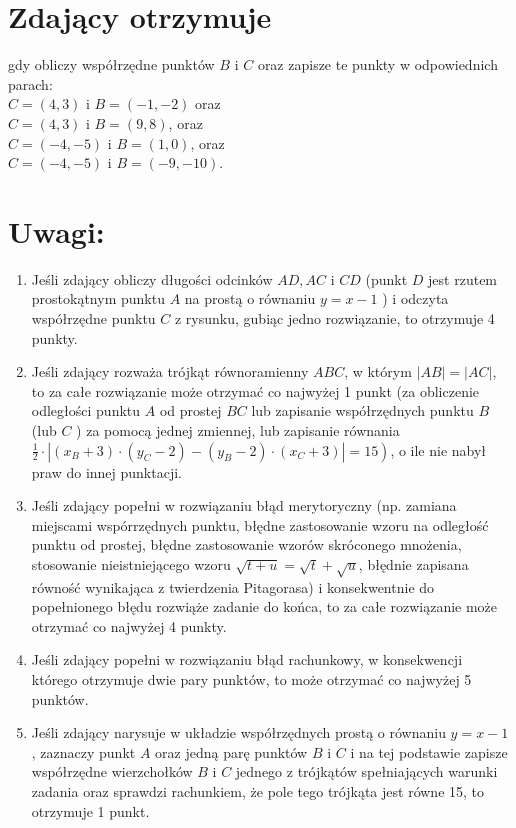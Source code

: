 \documentclass[10pt]{article}
\begin{document}
\section*{Zdający otrzymuje}
gdy obliczy współrzędne punktów $B$ i $C$ oraz zapisze te punkty w odpowiednich parach:\\
$C=(4,3)$ i $B=(-1,-2)$ oraz\\
$C=(4,3)$ i $B=(9,8)$, oraz\\
$C=(-4,-5)$ i $B=(1,0)$, oraz\\
$C=(-4,-5)$ i $B=(-9,-10)$.

\section*{Uwagi:}
\begin{enumerate}
  \item Jeśli zdający obliczy długości odcinków $A D, A C$ i $C D$ (punkt $D$ jest rzutem prostokątnym punktu $A$ na prostą o równaniu $y=x-1$ ) i odczyta współrzędne punktu $C$ z rysunku, gubiąc jedno rozwiązanie, to otrzymuje 4 punkty.
  \item Jeśli zdający rozważa trójkąt równoramienny $A B C$, w którym $|A B|=|A C|$, to za całe rozwiązanie może otrzymać co najwyżej 1 punkt (za obliczenie odległości punktu $A$ od prostej $B C$ lub zapisanie współrzędnych punktu $B$ (lub $C$ ) za pomocą jednej zmiennej, lub zapisanie równania $\left.\frac{1}{2} \cdot\left|\left(x_{B}+3\right) \cdot\left(y_{C}-2\right)-\left(y_{B}-2\right) \cdot\left(x_{C}+3\right)\right|=15\right)$, o ile nie nabył praw do innej punktacji.
  \item Jeśli zdający popełni w rozwiązaniu błąd merytoryczny (np. zamiana miejscami wspórrzędnych punktu, błędne zastosowanie wzoru na odległość punktu od prostej, błędne zastosowanie wzorów skróconego mnożenia, stosowanie nieistniejącego wzoru $\sqrt{t+u}=\sqrt{t}+\sqrt{u}$, błędnie zapisana równość wynikająca z twierdzenia Pitagorasa) i konsekwentnie do popełnionego błędu rozwiąże zadanie do końca, to za całe rozwiązanie może otrzymać co najwyżej 4 punkty.
  \item Jeśli zdający popełni w rozwiązaniu błąd rachunkowy, w konsekwencji którego otrzymuje dwie pary punktów, to może otrzymać co najwyżej 5 punktów.
  \item Jeśli zdający narysuje w układzie współrzędnych prostą o równaniu $y=x-1$, zaznaczy punkt $A$ oraz jedną parę punktów $B$ i $C$ i na tej podstawie zapisze współrzędne wierzchołków $B$ i $C$ jednego z trójkątów spełniających warunki zadania oraz sprawdzi rachunkiem, że pole tego trójkąta jest równe 15, to otrzymuje 1 punkt.
\end{enumerate}
\end{document}
